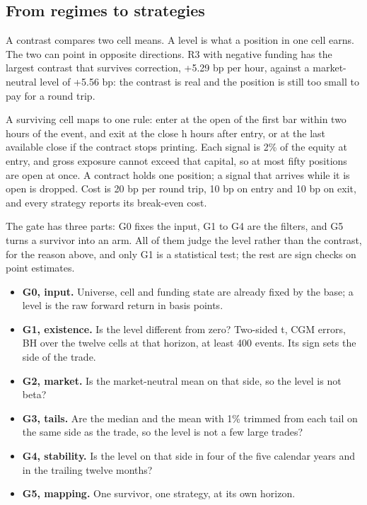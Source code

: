 \documentclass[11pt,a4paper]{article}
\begin{document}
\subsection{From regimes to strategies}

A contrast compares two cell means. A level is what a position in one cell earns. The two can point in opposite directions. R3 with negative funding has the largest contrast that survives correction, +5.29 bp per hour, against a market-neutral level of +5.56 bp: the contrast is real and the position is still too small to pay for a round trip.

A surviving cell maps to one rule: enter at the open of the first bar within two hours of the event, and exit at the close h hours after entry, or at the last available close if the contract stops printing. Each signal is 2\% of the equity at entry, and gross exposure cannot exceed that capital, so at most fifty positions are open at once. A contract holds one position; a signal that arrives while it is open is dropped. Cost is 20 bp per round trip, 10 bp on entry and 10 bp on exit, and every strategy reports its break-even cost.

The gate has three parts: G0 fixes the input, G1 to G4 are the filters, and G5 turns a survivor into an arm. All of them judge the level rather than the contrast, for the reason above, and only G1 is a statistical test; the rest are sign checks on point estimates.

\begin{itemize}
\item \textbf{G0, input.} Universe, cell and funding state are already fixed by the base; a level is the raw forward return in basis points.
\item \textbf{G1, existence.} Is the level different from zero? Two-sided t, CGM errors, BH over the twelve cells at that horizon, at least 400 events. Its sign sets the side of the trade.
\item \textbf{G2, market.} Is the market-neutral mean on that side, so the level is not beta?
\item \textbf{G3, tails.} Are the median and the mean with 1\% trimmed from each tail on the same side as the trade, so the level is not a few large trades?
\item \textbf{G4, stability.} Is the level on that side in four of the five calendar years and in the trailing twelve months?
\item \textbf{G5, mapping.} One survivor, one strategy, at its own horizon.
\end{itemize}
\end{document}
